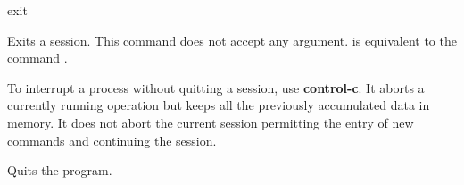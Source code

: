  
\begin{command}{exit}{} 

	\syntax{\obligatory{()}}

	\begin{poydescription}
         Exits a \poy session. This command does not accept any argument.
          is equivalent to the command .

 \begin{statement}
	To interrupt a process without quitting a \poy session, use {\bf control-c}.
         It aborts a currently running operation but keeps all the previously accumulated
         data in memory. It does not abort the current session permitting the entry of new
         commands and continuing the session.
        \end{statement}
	
	 \end{poydescription}
	 
    \begin{poyexamples}
            {Quits the program.}
    \end{poyexamples}

    \begin{poyalso}
    \end{poyalso}

\end{command}

 
